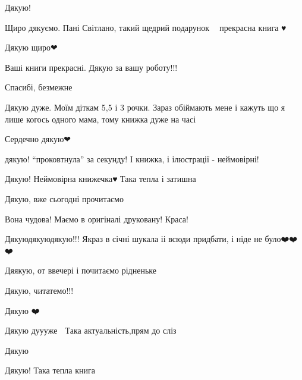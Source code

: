 Дякую!


Щиро дякуємо. Пані Світлано, такий щедрий подарунок 💙💛 прекрасна книга ♥️🌹


Дякую щиро❤


Ваші книги прекрасні. Дякую за вашу роботу!!!


Спасибі, безмежне💞💞💞


Дякую дуже. Моїм діткам 5,5 і 3 рочки. Зараз обіймають мене і кажуть що я лише
когось одного мама, тому книжка дуже на часі


Сердечно дякую❤


дякую! \enquote{проковтнула} за секунду! І книжка, і ілюстрації - неймовірні!


Дякую! Неймовірна книжечка♥️ Така тепла і затишна🥰


Дякую, вже сьогодні прочитаємо


Вона чудова! Маємо в оригіналі друковану! Краса!


Дякуюдякуюдякую!!! Якраз в січні шукала іі всюди придбати, і ніде не було❤️❤️❤️


Дяякую, от ввечері і почитаємо рідненьке 💙💛


Дякую, читатемо!!!

Дякую ❤️


Дякую дуууже 🙏
Така актуальність,прям до сліз 💙💛💙💛


Дякую🙏


Дякую! Така тепла книга 🤗


